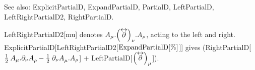 See also: ExplicitPartialD, ExpandPartialD, PartialD, LeftPartialD, LeftRightPartialD2, RightPartialD.


\dispSFinmath{
\mu 
}

\dispSFoutmath{
\mu 
}

\dispSFinmath{
\mu 
}


\dispSFinmath{
{{\left( \overvar{\partial }{\leftrightarrow } \right) }_{\mu }}
}










LeftRightPartialD2[mu] denotes \({A_{\mu }}.{{\left( \overvar{\partial }{\leftrightarrow } \right) }_{\nu }}.{A_{\rho }}\), acting to the left and
right. ExplicitPartialD[LeftRightPartialD2[\(\mathrm{ExpandPartialD}[\%]\)]] gives (RightPartialD[\(\frac{1}{2}\> {A_{\mu }}.{{\partial
}_{\nu }}A_{\rho }^{ }-\frac{1}{2}\> {{\partial }_{\nu }}A_{\mu }^{ }.{A_{\rho }}\)] \(+\) LeftPartialD[\({{\left( \overvar{\partial
}{\leftrightarrow } \right) }_{\mu }}\)]).

